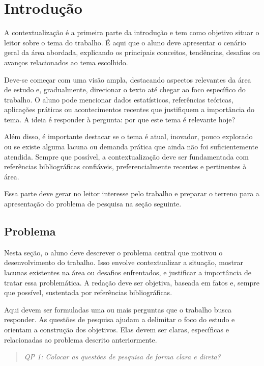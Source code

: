 \chapter{Introdução}
\label{cap:introducao}
A contextualização é a primeira parte da introdução e tem como objetivo situar o leitor sobre o tema do trabalho. É aqui que o aluno deve apresentar o cenário geral da área abordada, explicando os principais conceitos, tendências, desafios ou avanços relacionados ao tema escolhido.

Deve-se começar com uma visão ampla, destacando aspectos relevantes da área de estudo e, gradualmente, direcionar o texto até chegar ao foco específico do trabalho. O aluno pode mencionar dados estatísticos, referências teóricas, aplicações práticas ou acontecimentos recentes que justifiquem a importância do tema. A ideia é responder à pergunta: por que este tema é relevante hoje?

Além disso, é importante destacar se o tema é atual, inovador, pouco explorado ou se existe alguma lacuna ou demanda prática que ainda não foi suficientemente atendida. Sempre que possível, a contextualização deve ser fundamentada com referências bibliográficas confiáveis, preferencialmente recentes e pertinentes à área.

Essa parte deve gerar no leitor interesse pelo trabalho e preparar o terreno para a apresentação do problema de pesquisa na seção seguinte.

\section{Problema} 
Nesta seção, o aluno deve descrever o problema central que motivou o desenvolvimento do trabalho. Isso envolve contextualizar a situação, mostrar lacunas existentes na área ou desafios enfrentados, e justificar a importância de tratar essa problemática. A redação deve ser objetiva, baseada em fatos e, sempre que possível, sustentada por referências bibliográficas.

Aqui devem ser formuladas uma ou mais perguntas que o trabalho busca responder. As questões de pesquisa ajudam a delimitar o foco do estudo e orientam a construção dos objetivos. Elas devem ser claras, específicas e relacionadas ao problema descrito anteriormente.

\begin{quote}
\textit{QP 1: Colocar as questões de pesquisa de forma clara e direta?}
\end{quote}

